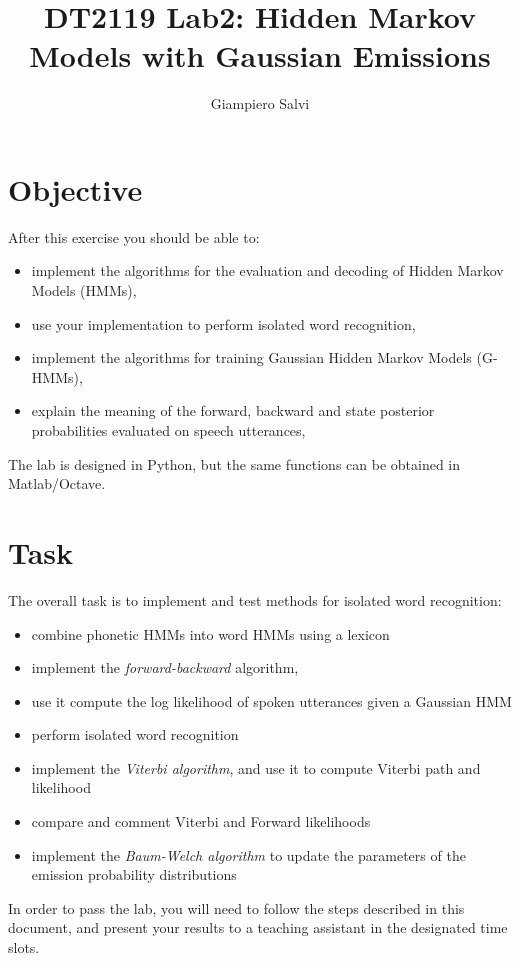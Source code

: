 \documentclass{nada-ten}
\author{Giampiero Salvi}
\title{DT2119 Lab2: Hidden Markov Models with Gaussian Emissions}
\begin{document}
\maketitle
\section{Objective}
After this exercise you should be able to:
\begin{itemize}
\item implement the algorithms for the evaluation and decoding of Hidden Markov Models (HMMs),
\item use your implementation to perform isolated word recognition,
\item implement the algorithms for training Gaussian Hidden Markov Models (G-HMMs),
\item explain the meaning of the forward, backward and state posterior probabilities evaluated on speech utterances,
\end{itemize}
The lab is designed in Python, but the same functions can be obtained in Matlab/Octave.

\section{Task}
The overall task is to implement and test methods for isolated word recognition:
\begin{itemize}
\item combine phonetic HMMs into word HMMs using a lexicon
\item implement the \emph{forward-backward} algorithm,
\item use it compute the log likelihood of spoken utterances given a Gaussian HMM
\item perform isolated word recognition
\item implement the \emph{Viterbi algorithm}, and use it to compute Viterbi path and likelihood
\item compare and comment Viterbi and Forward likelihoods
\item implement the \emph{Baum-Welch algorithm} to update the parameters of the emission probability distributions
\end{itemize}

In order to pass the lab, you will need to follow the steps described in this document, and present your results to a teaching assistant in the designated time slots.
\end{document}
